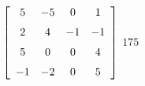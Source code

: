 {$\left[ \begin {array}{cccc} 5&-5&0&1\\\noalign{\medskip}2&4&-1&-1
\\\noalign{\medskip}5&0&0&4\\\noalign{\medskip}-1&-2&0&5\end {array} \right]$} 
{$175$}



  

